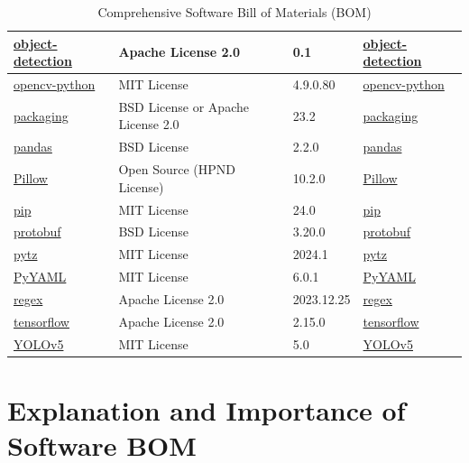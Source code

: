 \begin{table}[h!]
\begin{tabular}{|p{6cm}|p{3cm}|p{2.5cm}|p{4cm}|}
		\hline
		\href{https://pypi.org/project/object-detection/}{object-detection} & Apache License 2.0 & 0.1 & \href{https://pypi.org/project/object-detection/}{object-detection} \\
		\hline
		\href{https://pypi.org/project/opencv-python/}{opencv-python} & MIT License & 4.9.0.80 & \href{https://pypi.org/project/opencv-python/}{opencv-python} \\
		\hline
		\href{https://pypi.org/project/packaging/}{packaging} & BSD License or Apache License 2.0 & 23.2 & \href{https://pypi.org/project/packaging/}{packaging} \\
		\hline
		\href{https://pypi.org/project/pandas/}{pandas} & BSD License & 2.2.0 & \href{https://pypi.org/project/pandas/}{pandas} \\
		\hline
		\href{https://pypi.org/project/Pillow/}{Pillow} & Open Source (HPND License) & 10.2.0 & \href{https://pypi.org/project/Pillow/}{Pillow} \\
		\hline
		\href{https://pypi.org/project/pip/}{pip} & MIT License & 24.0 & \href{https://pypi.org/project/pip/}{pip} \\
		\hline
		\href{https://pypi.org/project/protobuf/}{protobuf} & BSD License & 3.20.0 & \href{https://pypi.org/project/protobuf/}{protobuf} \\
		\hline
		\href{https://pypi.org/project/pytz/}{pytz} & MIT License & 2024.1 & \href{https://pypi.org/project/pytz/}{pytz} \\
		\hline
		\href{https://pypi.org/project/PyYAML/}{PyYAML} & MIT License & 6.0.1 & \href{https://pypi.org/project/PyYAML/}{PyYAML} \\
		\hline
		\href{https://pypi.org/project/regex/}{regex} & Apache License 2.0 & 2023.12.25 & \href{https://pypi.org/project/regex/}{regex} \\
		\hline
		\href{https://pypi.org/project/tensorflow/}{tensorflow} & Apache License 2.0 & 2.15.0 & \href{https://pypi.org/project/tensorflow/}{tensorflow} \\
		\hline
		\href{https://github.com/ultralytics/yolov5}{YOLOv5} & MIT License & 5.0 & \href{https://github.com/ultralytics/yolov5}{YOLOv5} \\
		\hline
	\end{tabular}
	\caption{Comprehensive Software Bill of Materials (BOM)}
	\label{tab:packages}
\end{table}

\section{Explanation and Importance of Software BOM}

